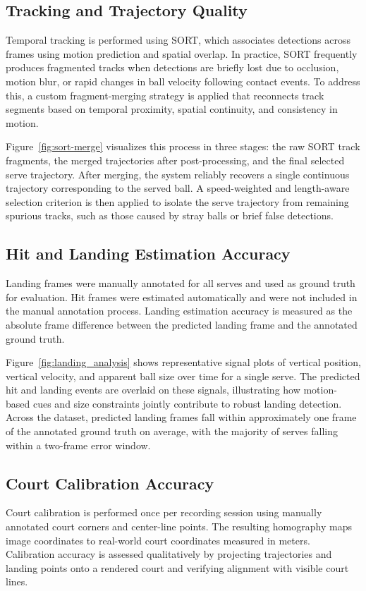 \subsection{Tracking and Trajectory Quality}
Temporal tracking is performed using SORT, which associates detections across frames using motion prediction and spatial overlap. In practice, SORT frequently produces fragmented tracks when detections are briefly lost due to occlusion, motion blur, or rapid changes in ball velocity following contact events. To address this, a custom fragment-merging strategy is applied that reconnects track segments based on temporal proximity, spatial continuity, and consistency in motion.

Figure~\ref{fig:sort-merge} visualizes this process in three stages: the raw SORT track fragments, the merged trajectories after post-processing, and the final selected serve trajectory. After merging, the system reliably recovers a single continuous trajectory corresponding to the served ball. A speed-weighted and length-aware selection criterion is then applied to isolate the serve trajectory from remaining spurious tracks, such as those caused by stray balls or brief false detections.

\subsection{Hit and Landing Estimation Accuracy}
Landing frames were manually annotated for all serves and used as ground truth for evaluation. Hit frames were estimated automatically and were not included in the manual annotation process. Landing estimation accuracy is measured as the absolute frame difference between the predicted landing frame and the annotated ground truth.

Figure~\ref{fig:landing_analysis} shows representative signal plots of vertical position, vertical velocity, and apparent ball size over time for a single serve. The predicted hit and landing events are overlaid on these signals, illustrating how motion-based cues and size constraints jointly contribute to robust landing detection. Across the dataset, predicted landing frames fall within approximately one frame of the annotated ground truth on average, with the majority of serves falling within a two-frame error window.

\subsection{Court Calibration Accuracy}
Court calibration is performed once per recording session using manually annotated court corners and center-line points. The resulting homography maps image coordinates to real-world court coordinates measured in meters. Calibration accuracy is assessed qualitatively by projecting trajectories and landing points onto a rendered court and verifying alignment with visible court lines.

